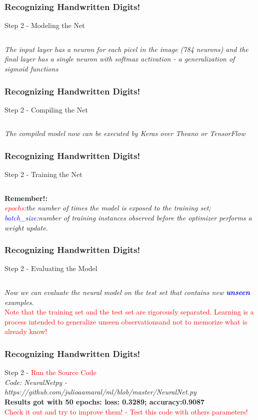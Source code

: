 \documentclass[aspectratio=169]{beamer}
\begin{document}
\begin{frame}
\frametitle{Recognizing Handwritten Digits!}
Step 2 - Modeling the Net
\inputminted{python}{sixteen.py}
\emph{The input layer has a neuron for each picel in the image (784 neurons) and the final layer has a single neuron with softmax activation - a generalization of sigmoid functions}
\end{frame}

\begin{frame}
\frametitle{Recognizing Handwritten Digits!}
Step 2 - Compiling the Net
\inputminted{python}{seventeen.py}
\emph{The compiled model now can be executed by Keras over Theano or TensorFlow}
\end{frame}

\begin{frame}
\frametitle{Recognizing Handwritten Digits!}
Step 2 - Training the Net
\inputminted{python}{eighteen.py}
\textbf{Remember!:}
\\[0.5cm]
\emph{\textcolor{red}{epochs}:the number of times the model is exposed to the training set; \textcolor{blue}{batch\_size}:number of training instances observed before the optimizer performs a weight update.}
\end{frame}

\begin{frame}
\frametitle{Recognizing Handwritten Digits!}
Step 2 - Evaluating the Model 
\inputminted{python}{nineteen.py}
\emph{Now we can evaluate the neural model on the test set that contains new \textit{\textbf{\textcolor{blue}{unseen}}} examples. }
\\[0.2cm]
\textcolor{red}{Note that the training set and the test set are rigorously separated. Learning is a process intended to generalize unseen observationsand not to memorize what is already know!}
\end{frame}

\begin{frame}
\frametitle{Recognizing Handwritten Digits!}
Step 2 - \textcolor{red}{Run the Source Code}
\\[0.5cm]
\emph{Code: NeuralNetpy - https://github.com/julioaamaral/ml/blob/master/NeuralNet.py}
\\[0.3cm]
\textbf{Results got with 50 epochs: loss: 0.3289; accuracy:0.9087}
\\[0.3cm]
\textcolor{red}{Check it out and try to improve them! - Test this code with others parameters!}
\end{frame}
\end{document}

